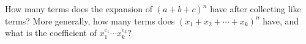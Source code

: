 How many terms does the expansion of $(a+b+c)^n$ have after collecting like terms? More generally, how many terms does $(x_1+x_2+\cdots+x_k)^n$ have, and what is the coefficient of $x_1^{e_1}\cdots x_k^{e_k}$?
